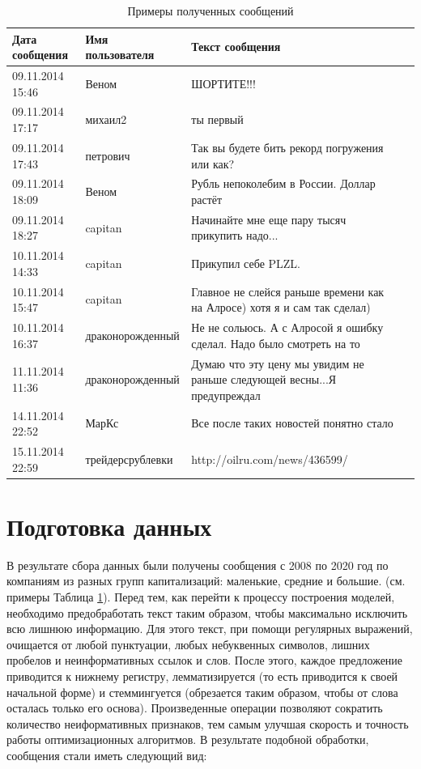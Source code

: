 \documentclass{article}
\begin{document}
\begin{table}[h]
	\caption{Примеры полученных сообщений}
	\centering
	\begin{tabular}{llp{9.45cm}l}
		\toprule
		Дата сообщения     &  Имя пользователя    & Текст сообщения  \\
		\midrule
		09.11.2014 15:46     & Веном  & ШОРТИТЕ!!!		\\
		09.11.2014 17:17     & михаил2 & ты первый	      \\
		09.11.2014 17:43     & петрович       & Так вы будете бить рекорд погружения или как?  \\
		09.11.2014 18:09     & Веном  & Рубль непоколебим в России.  Доллар растёт		\\
		09.11.2014 18:27     & capitan & Начинайте	мне еще пару тысяч прикупить надо...	      \\
		10.11.2014 14:33     & capitan       & Прикупил себе PLZL.  \\
		10.11.2014 15:47     & capitan       & Главное не слейся раньше времени	как на Алросе) хотя я и сам так сделал)  \\
		10.11.2014 16:37   & драконорожденный       & Не	не сольюсь.    А с Алросой я ошибку сделал. Надо было смотреть на то \\    
		11.11.2014 11:36     & драконорожденный       & Думаю	что эту цену мы увидим не раньше следующей весны...Я предупреждал \\    
		
		14.11.2014 22:52   & МарКс       & Все после таких новостей понятно стало \\    
		15.11.2014 22:59     & трейдерсрублевки       & http://oilru.com/news/436599/	 \\    
		\bottomrule
	\end{tabular}
	\label{tab:table}
\end{table}

\section{Подготовка данных}
\label{sec:prepare}
В результате сбора данных были получены сообщения с 2008 по 2020 год по компаниям из разных групп капитализаций: маленькие, средние и большие. (см. примеры Таблица \ref{tab:table}). Перед тем, как перейти к процессу построения моделей, необходимо предобработать текст таким образом, чтобы максимально исключить всю лишнюю информацию. Для этого текст, при помощи регулярных выражений, очищается от любой пунктуации, любых небуквенных символов, лишних пробелов и неинформативных ссылок и слов. После этого, каждое предложение приводится к нижнему регистру, лемматизируется (то есть приводится к своей начальной форме) и стеммингуется (обрезается таким образом, чтобы от слова осталась только его основа). Произведенные операции позволяют сократить количество неиформативных признаков, тем самым улучшая скорость и точность работы оптимизационных алгоритмов. В результате подобной обработки, сообщения стали иметь следующий вид:
\end{document}
